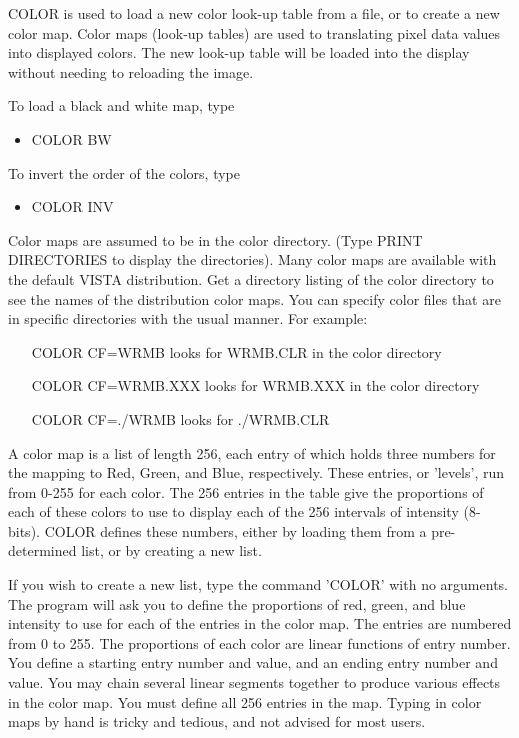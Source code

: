 COLOR is used to load a new color look-up table from a file, or to create a
new color map.  Color maps (look-up tables) are used to translating pixel
data values into displayed colors.  The new look-up table will be loaded
into the display without needing to reloading the image.

To load a black and white map, type 
\begin{itemize}
  \item{COLOR BW}
\end{itemize}
To invert the order of the colors, type
\begin{itemize}
  \item{COLOR INV}
\end{itemize}

Color maps are assumed to be in the color directory. (Type PRINT
DIRECTORIES to display the directories).  Many color maps are available
with the default VISTA distribution.  Get a directory listing of the color
directory to see the names of the distribution color maps.  You can specify
color files that are in specific directories with the usual manner.  For
example:
\begin{itemize}
  \item[COLOR CF=WRMB\hfill]{looks for WRMB.CLR in the color directory}
  \item[COLOR CF=WRMB.XXX\hfill]{looks for WRMB.XXX in the color directory}
  \item[COLOR CF=./WRMB\hfill]{looks for ./WRMB.CLR}
\end{itemize}

A color map is a list of length 256, each entry of which holds three
numbers for the mapping to Red, Green, and Blue, respectively.  These
entries, or 'levels', run from 0-255 for each color.  The 256 entries in
the table give the proportions of each of these colors to use to display
each of the 256 intervals of intensity (8-bits).  COLOR defines these
numbers, either by loading them from a pre-determined list, or by creating
a new list.

If you wish to create a new list, type the command 'COLOR' with no
arguments.  The program will ask you to define the proportions of red,
green, and blue intensity to use for each of the entries in the color map.
The entries are numbered from 0 to 255.  The proportions of each color are
linear functions of entry number.  You define a starting entry number and
value, and an ending entry number and value. You may chain several linear
segments together to produce various effects in the color map.  You must
define all 256 entries in the map.  Typing in color maps by hand is tricky
and tedious, and not advised for most users.

